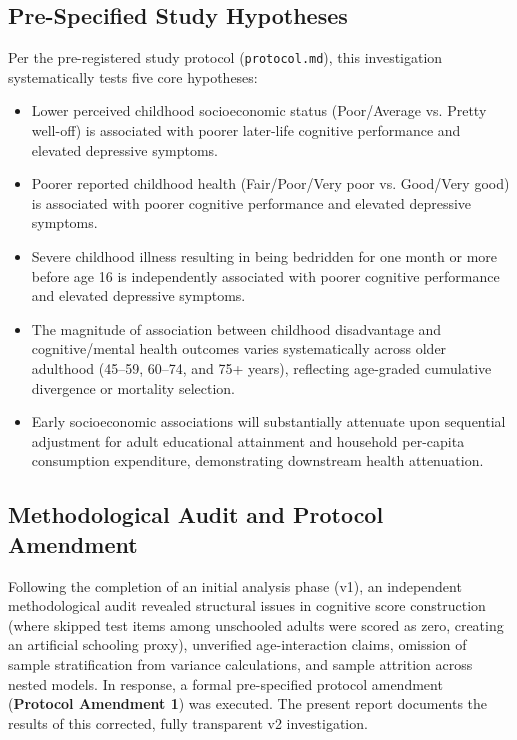\documentclass[11pt,a4paper]{article}
\begin{document}
\subsection{Pre-Specified Study Hypotheses}
Per the pre-registered study protocol (\texttt{protocol.md}), this investigation systematically tests five core hypotheses:
\begin{itemize}[leftmargin=2.5cm]
    \item[\textbf{Hypothesis 1:}] Lower perceived childhood socioeconomic status (Poor/Average vs. Pretty well-off) is associated with poorer later-life cognitive performance and elevated depressive symptoms.
    \item[\textbf{Hypothesis 2:}] Poorer reported childhood health (Fair/Poor/Very poor vs. Good/Very good) is associated with poorer cognitive performance and elevated depressive symptoms.
    \item[\textbf{Hypothesis 3:}] Severe childhood illness resulting in being bedridden for one month or more before age 16 is independently associated with poorer cognitive performance and elevated depressive symptoms.
    \item[\textbf{Hypothesis 4:}] The magnitude of association between childhood disadvantage and cognitive/mental health outcomes varies systematically across older adulthood (45--59, 60--74, and 75+ years), reflecting age-graded cumulative divergence or mortality selection.
    \item[\textbf{Hypothesis 5:}] Early socioeconomic associations will substantially attenuate upon sequential adjustment for adult educational attainment and household per-capita consumption expenditure, demonstrating downstream health attenuation.
\end{itemize}

\subsection{Methodological Audit and Protocol Amendment}
Following the completion of an initial analysis phase (v1), an independent methodological audit revealed structural issues in cognitive score construction (where skipped test items among unschooled adults were scored as zero, creating an artificial schooling proxy), unverified age-interaction claims, omission of sample stratification from variance calculations, and sample attrition across nested models. In response, a formal pre-specified protocol amendment (\textbf{Protocol Amendment 1}) was executed. The present report documents the results of this corrected, fully transparent v2 investigation.
\end{document}
